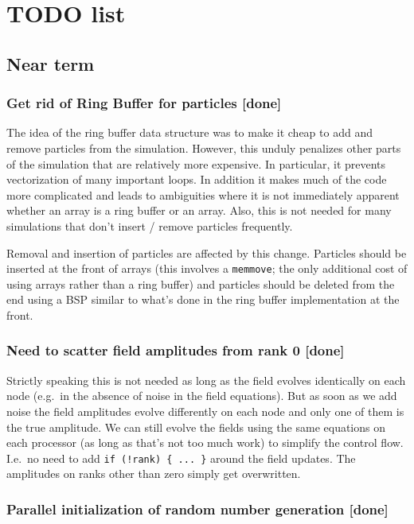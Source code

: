 \documentclass[aps, superscriptaddress, groupedaddress, preprint]{revtex4}
\begin{document}
\section{TODO list}

\subsection{Near term}

\subsubsection{Get rid of Ring Buffer for particles {\bf [done]}}

The idea of the ring buffer data structure was to make it cheap
to add and remove particles from the simulation.  However, this
unduly penalizes other parts of the simulation that are
relatively more expensive.  In particular, it prevents
vectorization of many important loops.  In addition it makes much
of the code more complicated and leads to ambiguities where it is
not immediately apparent whether an array is a ring buffer or an
array.  Also, this is not needed for many simulations that don't
insert / remove particles frequently.

Removal and insertion of particles are affected by this change.
Particles should be inserted at the front of arrays (this
involves a \verb~memmove~; the only additional cost of using
arrays rather than a ring buffer) and particles should be deleted
from the end using a BSP similar to what's done in the ring
buffer implementation at the front.


\subsubsection{Need to scatter field amplitudes from rank 0 {\bf
[done]}}

Strictly speaking this is not needed as long as the field evolves
identically on each node (e.g.\ in the absence of noise in the
field equations).  But as soon as we add noise the field
amplitudes evolve differently on each node and only one of them
is the true amplitude.  We can still evolve the fields using the
same equations on each processor (as long as that's not too much
work) to simplify the control flow.  I.e.\ no need to add 
\verb~if (!rank) { ... }~ around the field updates.  The
amplitudes on ranks other than zero simply get overwritten.


\subsubsection{Parallel initialization of random number
generation {\bf [done]}}
\end{document}
